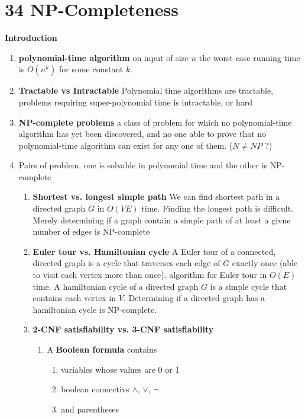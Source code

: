 \documentclass[11pt]{article}
\begin{document}
\section*{34 NP-Completeness}

\begin{defn*}
    \textbf{Introduction}
    \begin{enumerate}
        \item \textbf{polynomial-time algorithm} on input of size $n$ the worst case running time is $O(n^k)$ for some constant $k$. 
        \item \textbf{Tractable vs Intractable} Polynomial time algorithms are tractable, problems requiring super-polynomial time is intractable, or hard
        \item \textbf{NP-complete problems} a class of problem for which no polynomial-time algorithm has yet been discovered, and no one able to prove that no polynomial-time algorithm can exist for any one of them. ($N \neq NP$ ?)
        \item Pairs of problem, one is solvable in polynomial time and the other is NP-complete 
        \begin{enumerate}
            \item \textbf{Shortest vs. longest simple path} We can find shortest path in a directed graph $G$ in $O(VE)$ time. Finding the longest path is difficult. Merely determining if a graph contain a simple path of at least a givne number of edges is NP-complete 
            \item \textbf{Euler tour vs. Hamiltonian cycle} A Euler tour of a connected, directed graph is a cycle that traverses each edge of $G$ exactly once (able to visit each vertex more than once). algorithm for Euler tour in $O(E)$ time. A hamiltonian cycle of a directed graph $G$ is a simple cycle that contains each vertex in $V$. Determining if a directed graph has a hamiltonian cycle is NP-complete. 
            \item \textbf{2-CNF satisfiability vs. 3-CNF satisfiability} 
            \begin{enumerate}
                \item A \textbf{Boolean formula} contains 
                 \begin{enumerate}
                    \item variables whose values are 0 or 1
                    \item boolean connectivs $\land$, $\lor$, $\neg$
                    \item and parentheses

\end{enumerate}
\end{enumerate}
\end{enumerate}
\end{enumerate}
\end{defn*}
\end{document}
